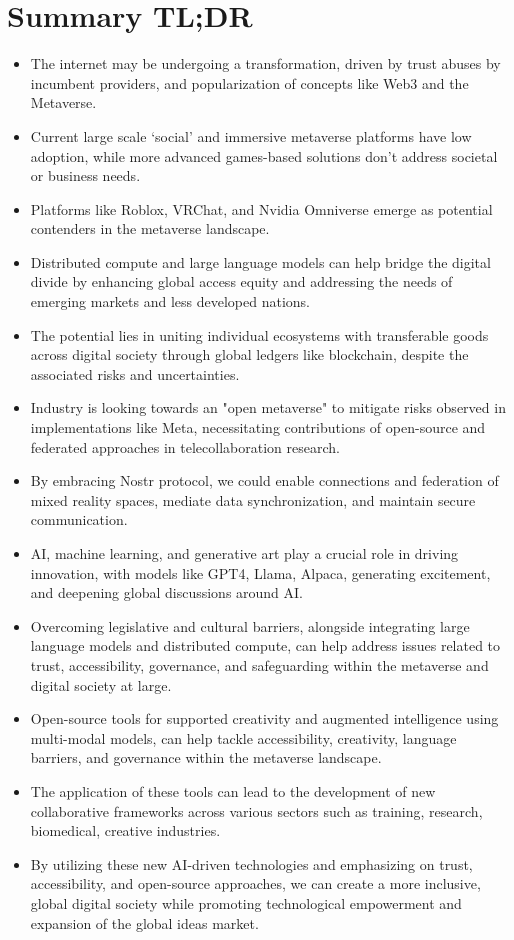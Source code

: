 \section{Summary TL;DR} \label{sec:tldr} \begin{itemize} \item The internet may be undergoing a transformation, driven by trust abuses by incumbent providers, and popularization of concepts like Web3 and the Metaverse. \item Current large scale `social' and immersive metaverse platforms have low adoption, while more advanced games-based solutions don't address societal or business needs. \item Platforms like Roblox, VRChat, and Nvidia Omniverse emerge as potential contenders in the metaverse landscape. \item Distributed compute and large language models can help bridge the digital divide by enhancing global access equity and addressing the needs of emerging markets and less developed nations. \item The potential lies in uniting individual ecosystems with transferable goods across digital society through global ledgers like blockchain, despite the associated risks and uncertainties. \item Industry is looking towards an "open metaverse" to mitigate risks observed in implementations like Meta, necessitating contributions of open-source and federated approaches in telecollaboration research. \item By embracing Nostr protocol, we could enable connections and federation of mixed reality spaces, mediate data synchronization, and maintain secure communication. \item AI, machine learning, and generative art play a crucial role in driving innovation, with models like GPT4, Llama, Alpaca, generating excitement, and deepening global discussions around AI. \item Overcoming legislative and cultural barriers, alongside integrating large language models and distributed compute, can help address issues related to trust, accessibility, governance, and safeguarding within the metaverse and digital society at large. \item Open-source tools for supported creativity and augmented intelligence using multi-modal models, can help tackle accessibility, creativity, language barriers, and governance within the metaverse landscape. \item The application of these tools can lead to the development of new collaborative frameworks across various sectors such as training, research, biomedical, creative industries. \item By utilizing these new AI-driven technologies and emphasizing on trust, accessibility, and open-source approaches, we can create a more inclusive, global digital society while promoting technological empowerment and expansion of the global ideas market. \end{itemize}